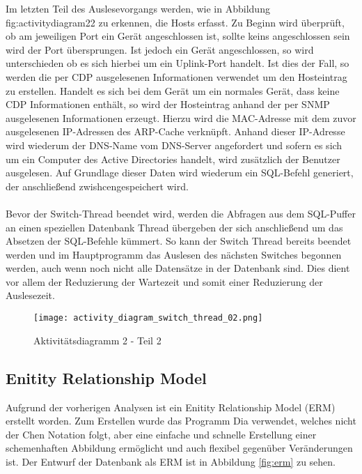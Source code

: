 Im letzten Teil des Auslesevorgangs werden, wie in Abbildung fig:activitydiagram22 zu erkennen, die Hosts erfasst.
Zu Beginn wird überprüft, ob am jeweiligen Port ein Gerät angeschlossen ist, sollte keins angeschlossen sein wird der Port übersprungen. Ist jedoch ein Gerät angeschlossen, so wird unterschieden ob es sich hierbei um ein Uplink-Port handelt. Ist dies der Fall, so werden die per CDP ausgelesenen Informationen verwendet um den Hosteintrag zu erstellen.
Handelt es sich bei dem Gerät um ein normales Gerät, dass keine CDP Informationen enthält, so wird der Hosteintrag anhand der per SNMP ausgelesenen Informationen erzeugt.
Hierzu wird die MAC-Adresse mit dem zuvor ausgelesenen IP-Adressen des ARP-Cache verknüpft. Anhand dieser IP-Adresse wird wiederum der DNS-Name vom DNS-Server angefordert und sofern es sich um ein Computer des Active Directories handelt, wird zusätzlich der Benutzer ausgelesen.
Auf Grundlage dieser Daten wird wiederum ein SQL-Befehl generiert, der anschließend zwishcengespeichert wird.\\\\
Bevor der Switch-Thread beendet wird, werden die Abfragen aus dem SQL-Puffer an einen speziellen Datenbank Thread übergeben der sich anschließend um das Absetzen der SQL-Befehle kümmert. So kann der Switch Thread bereits beendet werden und im Hauptprogramm das Auslesen des nächsten Switches begonnen werden, auch wenn noch nicht alle Datensätze in der Datenbank sind. Dies dient vor allem der Reduzierung der Wartezeit und somit einer Reduzierung der Auslesezeit.

\begin{figure}[H]
\centering
\texttt{[image: activity\_diagram\_switch\_thread\_02.png]}
\caption{Aktivitätsdiagramm 2 - Teil 2}
\label{fig:activitydiagram22}
\end{figure}

\subsection{Enitity Relationship Model}
\label{subsec:erm-diagram}

Aufgrund der vorherigen Analysen ist ein Enitity Relationship Model (ERM) erstellt
worden. Zum Erstellen wurde das Programm Dia verwendet, welches nicht der Chen
Notation folgt, aber eine einfache und schnelle Erstellung einer schemenhaften Abbildung ermöglicht und auch flexibel gegenüber Veränderungen ist.
Der Entwurf der Datenbank als ERM ist in Abbildung \ref{fig:erm} zu sehen.

